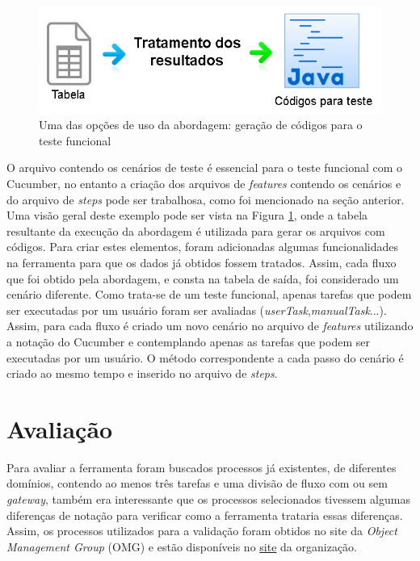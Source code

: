 \documentclass[12pt]{article}
\begin{document}
\begin{figure}[ht]
\centering
\includegraphics[width=.9\textwidth]{figuras/abordagem2.png}
\caption{Uma das opções de uso da abordagem: geração de códigos para o teste funcional}
\label{fig:abordagem2}
\end{figure}

O arquivo contendo os cenários de teste é essencial para o teste funcional com o Cucumber, no entanto a criação dos arquivos de \emph{features} contendo os cenários e do arquivo de \emph{steps} pode ser trabalhosa, como foi mencionado na seção anterior. Uma visão geral deste exemplo pode ser vista na Figura \ref{fig:abordagem2}, onde a tabela resultante da execução da abordagem é utilizada para gerar os arquivos com códigos. Para criar estes elementos, foram adicionadas algumas funcionalidades na ferramenta para que os dados já obtidos fossem tratados. Assim, cada fluxo que foi obtido pela abordagem, e consta na tabela de saída, foi considerado um cenário diferente. Como trata-se de um teste funcional, apenas tarefas que podem ser executadas por um usuário foram ser avaliadas (\emph{userTask},\emph{manualTask}...). Assim, para cada fluxo é criado um novo cenário no arquivo de \emph{features} utilizando a notação do Cucumber e contemplando apenas as tarefas que podem ser executadas por um usuário. O método correspondente a cada passo do cenário é criado ao mesmo tempo e inserido no arquivo de \emph{steps}. %


\section{Avaliação}
Para avaliar a ferramenta foram buscados processos já existentes, de diferentes domínios, contendo ao menos três tarefas e uma divisão de fluxo com ou sem \emph{gateway}, também era interessante que os processos selecionados tivessem algumas diferenças de notação para verificar como a ferramenta trataria essas diferenças. Assim, os processos utilizados para a validação foram obtidos no site da \emph{Object Management Group} (OMG) e estão disponíveis no \href{http://www.omg.org/spec/BPMN/20100602/2010-06-03/}{site} da organização.
\end{document}
